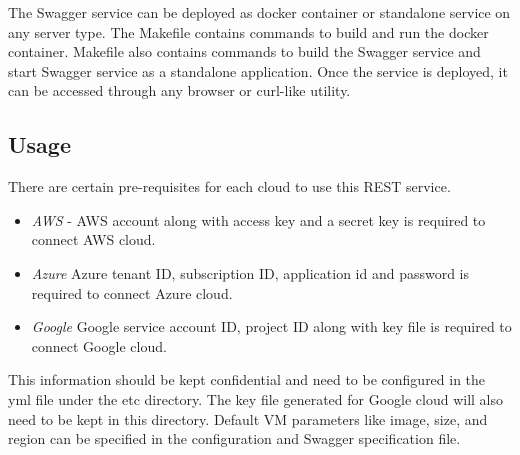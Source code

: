 The Swagger service can be deployed as docker container or
standalone service on any server type. The Makefile contains commands to 
build and run the docker container. Makefile also contains commands to build
the Swagger service and start Swagger service as a standalone application. Once
the service is deployed, it can be accessed through any browser or curl-like
utility.


\subsection{Usage}

There are certain pre-requisites for each cloud to use
this REST service.
\begin{itemize}
\item \emph{AWS} - AWS account along with access key and a secret key is
required to connect AWS cloud.
\item \emph{Azure}
Azure tenant ID, subscription ID, application id and password is required to
connect Azure cloud.
\item \emph{Google}
Google service account ID, project ID along with key file is required to
connect Google cloud.
\end{itemize}
This information should be kept confidential and need to be configured in the
yml file under the etc directory. The key file generated for Google cloud will
also need to be kept in this directory. Default VM parameters like image, size,
and region can be specified in the configuration and Swagger specification
file.

